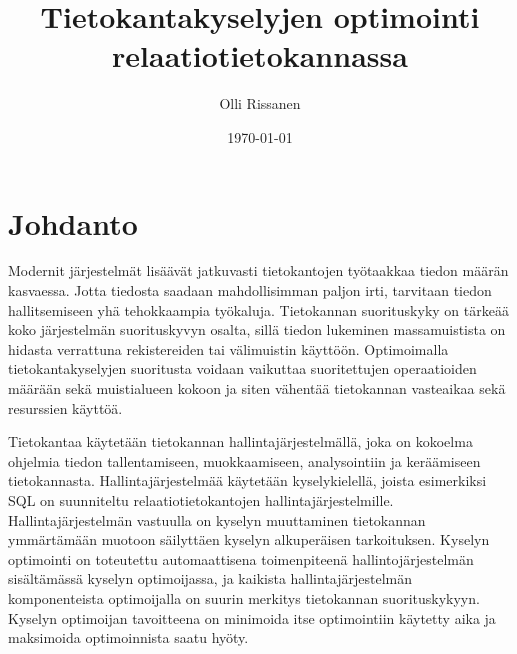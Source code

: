 \documentclass[finnish]{tktltiki2}
\title{Tietokantakyselyjen optimointi relaatiotietokannassa}
\author{Olli Rissanen}
\date{\today}
\theoremstyle{definition}
\theoremstyle{remark}
\begin{document}

\maketitle
\makeabstract
\tableofcontents
\newpage


\section{Johdanto}
Modernit järjestelmät lisäävät jatkuvasti tietokantojen työtaakkaa tiedon määrän kasvaessa. Jotta tiedosta saadaan mahdollisimman paljon irti, tarvitaan tiedon hallitsemiseen yhä tehokkaampia työkaluja. %
Tietokannan suorituskyky on tärkeää koko järjestelmän suorituskyvyn osalta, sillä tiedon lukeminen massamuistista on hidasta verrattuna rekistereiden tai välimuistin käyttöön. Optimoimalla tietokantakyselyjen suoritusta voidaan vaikuttaa suoritettujen operaatioiden määrään sekä muistialueen kokoon ja siten vähentää tietokannan vasteaikaa sekä resurssien käyttöä. \cite{mor2012}
	
% 

Tietokantaa käytetään tietokannan hallintajärjestelmällä, joka on kokoelma ohjelmia tiedon tallentamiseen, muokkaamiseen, analysointiin ja keräämiseen tietokannasta. Hallintajärjestelmää käytetään kyselykielellä, joista esimerkiksi SQL \cite{5391051} on suunniteltu relaatiotietokantojen hallintajärjestelmille. Hallintajärjestelmän vastuulla on kyselyn muuttaminen tietokannan ymmärtämään muotoon säilyttäen kyselyn alkuperäisen tarkoituksen. Kyselyn optimointi on toteutettu automaattisena toimenpiteenä hallintojärjestelmän sisältämässä kyselyn optimoijassa, ja kaikista hallintajärjestelmän komponenteista optimoijalla on suurin merkitys tietokannan suorituskykyyn. \cite{mor2012} Kyselyn optimoijan tavoitteena on minimoida itse optimointiin käytetty aika ja maksimoida optimoinnista saatu hyöty. \cite{jarke1984} 
\end{document}
